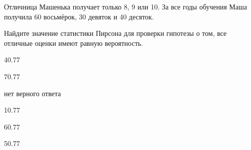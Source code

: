 
\begin{question}
Отличница Машенька получает только 8, 9 или 10. За все годы обучения
Маша получила 60 восьмёрок, 30 девяток и 40 десяток.

Найдите значение статистики Пирсона для проверки гипотезы о том, все
отличные оценки имеют равную вероятность.
\begin{answerlist}
  \item 40.77
  \item 70.77
  \item нет верного ответа
  \item 10.77
  \item 60.77
  \item 50.77
\end{answerlist}
\end{question}


